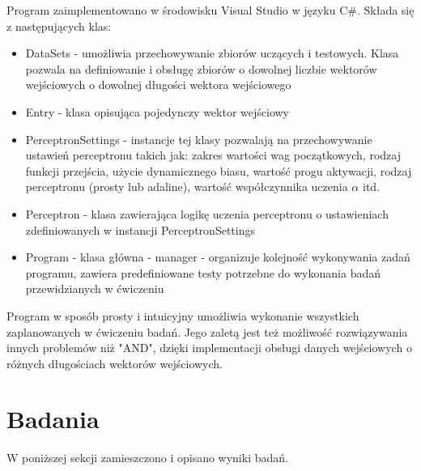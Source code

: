 \documentclass[17pt]{article}
\begin{document}
Program zaimplementowano w środowisku Visual Studio w języku C\#. Składa się z następujących klas:
\begin{itemize}
\item DataSets - umożliwia przechowywanie zbiorów uczących i testowych. Klasa pozwala na definiowanie i obsługę zbiorów o dowolnej liczbie wektorów wejściowych o dowolnej długości wektora wejściowego
\item Entry - klasa opisująca pojedynczy wektor wejściowy
\item PerceptronSettings - instancje tej klasy pozwalają na przechowywanie ustawień perceptronu takich jak: zakres wartości wag początkowych, rodzaj funkcji przejścia, użycie dynamicznego biasu, wartość progu aktywacji, rodzaj perceptronu (prosty lub adaline), wartość współczynnika uczenia $\alpha$ itd.
\item Perceptron - klasa zawierająca logikę uczenia perceptronu o ustawieniach zdefiniowanych w instancji PerceptronSettings
\item Program - klasa główna - manager - organizuje kolejność wykonywania zadań programu, zawiera predefiniowane testy potrzebne do wykonania badań przewidzianych w ćwiczeniu
\end{itemize}

Program w sposób prosty i intuicyjny umożliwia wykonanie wszystkich zaplanowanych w ćwiczeniu badań. Jego zaletą jest też możliwość rozwiązywania innych problemów niż "AND", dzięki implementacji obsługi danych wejściowych o różnych długościach wektorów wejściowych.

\section{Badania}
W poniższej sekcji zamieszczono i opisano wyniki badań.
\end{document}
